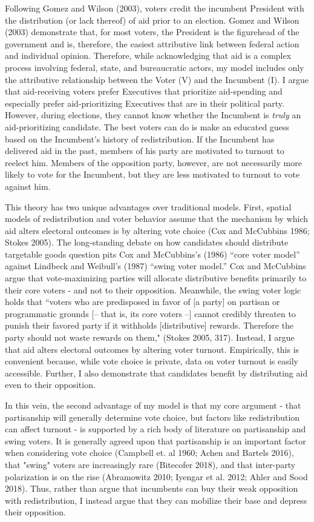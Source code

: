 \documentclass[12pt]{paper}
\begin{document}
Following Gomez and Wilson (2003), voters credit the incumbent President with the distribution (or lack thereof) of aid prior to an election. Gomez and Wilson (2003) demonstrate that, for most voters, the President is the figurehead of the government and is, therefore, the easiest attributive link between federal action and individual opinion. Therefore, while acknowledging that aid is a complex process involving federal, state, and bureaucratic actors, my model includes only the attributive relationship between the Voter (V) and the Incumbent (I). I argue that aid-receiving voters prefer Executives that prioritize aid-spending and especially prefer aid-prioritizing Executives that are in their political party. However, during elections, they cannot know whether the Incumbent is \textit{truly} an aid-prioritizing candidate. The best voters can do is make an educated guess based on the Incumbent's history of redistribution. If the Incumbent has delivered aid in the past, members of his party are motivated to turnout to reelect him. Members of the opposition party, however, are not necessarily more likely to vote for the Incumbent, but they are less motivated to turnout to vote against him.

This theory has two unique advantages over traditional models. First, spatial models of redistribution and voter behavior assume that the mechanism by which aid alters electoral outcomes is by altering vote choice (Cox and McCubbins 1986; Stokes 2005). The long-standing debate on how candidates should distribute targetable goods question pits Cox and McCubbins's (1986) ``core voter model” against Lindbeck and Weibull's (1987) ``swing voter model.” Cox and McCubbins argue that vote-maximizing parties will allocate distributive benefits primarily to their core voters - and not to their opposition. Meanwhile, the swing voter logic holds that ``voters who are predisposed in favor of [a party] on partisan or programmatic grounds [– that is, its core voters –] cannot credibly threaten to punish their favored party if it withholds [distributive] rewards. Therefore the party should not waste rewards on them," (Stokes 2005, 317). Instead, I argue that aid alters electoral outcomes by altering voter turnout. Empirically, this is convenient because, while vote choice is private, data on voter turnout is easily accessible. Further, I also demonstrate that candidates benefit by distributing aid even to their opposition.

In this vein, the second advantage of my model is that my core argument - that partisanship will generally determine vote choice, but factors like redistribution can affect turnout - is supported by a rich body of literature on partisanship and swing voters. It is generally agreed upon that partisanship is an important factor when considering vote choice (Campbell et. al 1960; Achen and Bartels 2016), that "swing" voters are increasingly rare (Bitecofer 2018), and that inter-party polarization is on the rise (Abramowitz 2010; Iyengar et al. 2012; Ahler and Sood 2018). Thus, rather than argue that incumbents can buy their weak opposition with redistribution, I instead argue that they can mobilize their base and depress their opposition.
\end{document}
